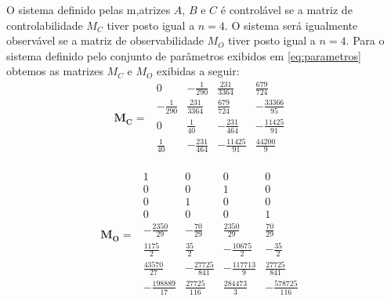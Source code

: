\documentclass[a4paper]{ifacconf}
\begin{document}
    O sistema definido pelas m,atrizes $A$, $B$ e $C$ é controlável se a matriz de controlabilidade $M_C$ tiver posto igual a $n=4$. O sistema será igualmente observável se a matriz de observabilidade $M_O$ tiver posto igual a $n=4$. Para o sistema definido pelo conjunto de parâmetros exibidos em \ref{eq:parametros} obtemos as matrizes $M_C$ e $M_O$ exibidas a seguir:
    \FloatBarrier
    \begin{equation} \label{eq:MC}
          \begin{split}
             \mathbf{M_C}=
        \end{split}
    \begin{smallmatrix}
                   0& -\frac{1}{290}&     \frac{231}{3364}&  \frac{679}{724}&\\  
      -\frac{1}{290}&  \frac{231}{3364}&  \frac{679}{724}&   -\frac{33366}{95}&\\
                   0&  \frac{1}{40}&     -\frac{231}{464}&  -\frac{11425}{91}&\\  
        \frac{1}{40}& -\frac{231}{464}&  -\frac{11425}{91}&  \frac{44200}{9}&\\
    \end{smallmatrix}
    \end{equation}
 
    \begin{equation} \label{eq:MO}
        \begin{split}
             \mathbf{M_O}=
        \end{split}
        \begin{smallmatrix}
           1&              0&              0&              0&\\
           0&              0&              1&              0&\\       
           0&              1&              0&              0&\\       
           0&              0&              0&              1&\\    
       -\frac{2350}{29}&   -\frac{70}{29}&      \frac{2350}{29}&   \frac{ 70}{29}&\\    
        \frac{1175}{2}&     \frac{35}{2}&      -\frac{10675}{2}&  -\frac{35}{2}&\\    
        \frac{43570}{27}&  -\frac{27725}{841}& -\frac{117713}{9}&  \frac{27725}{841}&\\
       -\frac{198889}{17}&  \frac{27725}{116}&  \frac{284473}{3}& -\frac{578725}{116}&\\
        \end{smallmatrix}
    \end{equation}
\end{document}

